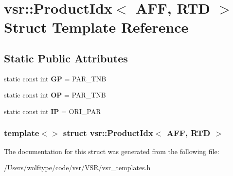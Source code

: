 \hypertarget{structvsr_1_1_product_idx_3_01_a_f_f_00_01_r_t_d_01_4}{\section{vsr\-:\-:Product\-Idx$<$ A\-F\-F, R\-T\-D $>$ Struct Template Reference}
\label{structvsr_1_1_product_idx_3_01_a_f_f_00_01_r_t_d_01_4}
}
\subsection*{Static Public Attributes}
\begin{DoxyCompactItemize}
\item 
\hypertarget{structvsr_1_1_product_idx_3_01_a_f_f_00_01_r_t_d_01_4_a7c33a11aa9f3faf61f016a21e9bb42bc}{static const int {\bfseries G\-P} = P\-A\-R\-\_\-\-T\-N\-B}\label{structvsr_1_1_product_idx_3_01_a_f_f_00_01_r_t_d_01_4_a7c33a11aa9f3faf61f016a21e9bb42bc}

\item 
\hypertarget{structvsr_1_1_product_idx_3_01_a_f_f_00_01_r_t_d_01_4_af56923aaf4f5ad0ce6c4829838c4d7ad}{static const int {\bfseries O\-P} = P\-A\-R\-\_\-\-T\-N\-B}\label{structvsr_1_1_product_idx_3_01_a_f_f_00_01_r_t_d_01_4_af56923aaf4f5ad0ce6c4829838c4d7ad}

\item 
\hypertarget{structvsr_1_1_product_idx_3_01_a_f_f_00_01_r_t_d_01_4_ac919b9ea4d2de48283740d7752576d14}{static const int {\bfseries I\-P} = O\-R\-I\-\_\-\-P\-A\-R}\label{structvsr_1_1_product_idx_3_01_a_f_f_00_01_r_t_d_01_4_ac919b9ea4d2de48283740d7752576d14}

\end{DoxyCompactItemize}
\subsubsection*{template$<$$>$ struct vsr\-::\-Product\-Idx$<$ A\-F\-F, R\-T\-D $>$}



The documentation for this struct was generated from the following file\-:\begin{DoxyCompactItemize}
\item 
/\-Users/wolftype/code/vsr/\-V\-S\-R/vsr\-\_\-templates.\-h\end{DoxyCompactItemize}
